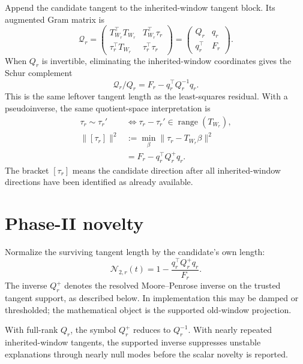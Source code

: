 \documentclass[10pt,twocolumn]{article}
\newcommand{\range}{\operatorname{range}}
\newcommand{\nov}{\mathcal N}
\begin{document}
Append the candidate tangent to the inherited-window tangent block. Its augmented Gram matrix is
\begin{equation}
\mathcal Q_r
=
\begin{pmatrix}
T_{W_r}^\top T_{W_r}&T_{W_r}^\top\tau_r\\
\tau_r^\top T_{W_r}&\tau_r^\top\tau_r
\end{pmatrix}
=
\begin{pmatrix}
Q_r&q_r\\
q_r^\top&F_r
\end{pmatrix}.
\label{eq:p1_block_gram}
\end{equation}
When \(Q_r\) is invertible, eliminating the inherited-window coordinates gives the Schur complement
\begin{equation}
\mathcal Q_r/Q_r=F_r-q_r^\top Q_r^{-1}q_r.
\label{eq:p1_schur_residual}
\end{equation}
This is the same leftover tangent length as the least-squares residual. With a pseudoinverse, the same quotient-space interpretation is
\begin{equation}
\begin{aligned}
\tau_r\sim\tau_r'
&\Longleftrightarrow
\tau_r-\tau_r'\in\range(T_{W_r}),\\
\|[\tau_r]\|^2
&:=\min_\beta\|\tau_r-T_{W_r}\beta\|^2\\
&=F_r-q_r^\top Q_r^+q_r.
\end{aligned}
\label{eq:p1_quotient_norm}
\end{equation}
The bracket \([\tau_r]\) means the candidate direction after all inherited-window directions have been identified as already available.

\section{Phase-II novelty}

Normalize the surviving tangent length by the candidate's own length:
\begin{equation}
\boxed{
\nov_{2,r}(t)=1-\frac{q_r^\top Q_r^+q_r}{F_r}.
}
\label{eq:p1_n2}
\end{equation}
The inverse \(Q_r^+\) denotes the resolved Moore--Penrose inverse on the trusted tangent support, as described below. In implementation this may be damped or thresholded; the mathematical object is the supported old-window projection.

\begin{cautionbox}
With full-rank \(Q_r\), the symbol \(Q_r^+\) reduces to \(Q_r^{-1}\). With nearly repeated inherited-window tangents, the supported inverse suppresses unstable explanations through nearly null modes before the scalar novelty is reported.
\end{cautionbox}
\end{document}
